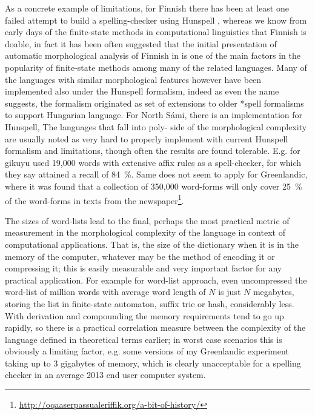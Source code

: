 \documentclass[officiallayout]{unihelcompling}
\begin{document}
As a concrete example of limitations, for Finnish there has been at least one
failed attempt to build a spelling-checker using Hunspell
\citep{pitkanen2006hunspell}, whereas we know from early days of the
finite-state methods in computational linguistics that Finnish is doable, in
fact it has been often suggested that the initial presentation of automatic
morphological analysis of Finnish in \citet{koskenniemi1983twolevel} is one of
the main factors in the popularity of finite-state methods among many of the
related languages. Many of the languages with similar morphological features
however have been implemented also under the Hunspell formalism, indeed as even
the name suggests, the formalism originated as set of extensions to older
*spell formalisms to support Hungarian language. For North Sámi, there is an
implementation for Hunspell, The languages that fall into poly- side of the
morphological complexity are usually noted as very hard to properly implement
with current Hunspell formalism and limitations, though often the results are
found tolerable. E.g. for gikuyu \citet{chege2010developing} used 19,000 words
with extensive affix rules as a spell-checker, for which they say attained a
recall of 84~\%. Same does not seem to apply for Greenlandic, where it was
found that a collection of 350,000 word-forms will only cover 25~\% of the
word-forms in texts from the
newspaper\footnote{\url{http://oqaaserpassualeriffik.org/a-bit-of-history/}}.

The sizes of word-lists lead to the final, perhaps the most practical metric of
measurement in the morphological complexity of the language in context of
computational applications. That is, the size of the dictionary when it is in
the memory of the computer, whatever may be the method of encoding it or
compressing it; this is easily measurable and very important factor for any
practical application.  For example for word-list approach, even uncompressed
the word-list of million words with average word length of $N$ is just $N$
megabytes, storing the list in finite-state automaton, suffix trie or hash,
considerably less. With derivation and compounding the memory requirements tend
to go up rapidly, so there is a practical correlation measure between the
complexity of the language defined in theoretical terms earlier; in worst case
scenarios this is obviously a limiting factor, e.g. some versions of my
Greenlandic experiment taking up to 3 gigabytes of memory, which is clearly
unacceptable for a spelling checker in an average 2013 end user computer
system.
\end{document}
